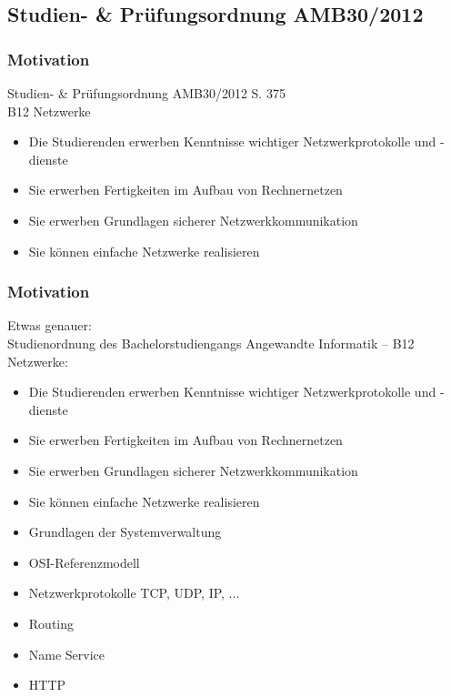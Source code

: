 \documentclass[xcolor=dvipsnames,aspectratio=169]{beamer}
\begin{document}
\subsection{Studien- \& Prüfungsordnung AMB30/2012}
\begin{frame}
	\frametitle{Motivation}
	Studien- \& Prüfungsordnung AMB30/2012 S. 375\\
	B12 Netzwerke
	\begin{itemize}
		\item Die Studierenden erwerben Kenntnisse wichtiger Netzwerkprotokolle und -dienste
		\item Sie erwerben Fertigkeiten im Aufbau von Rechnernetzen
		\item Sie erwerben Grundlagen sicherer Netzwerkkommunikation
		\item Sie können einfache Netzwerke realisieren
	\end{itemize}
\end{frame}
\begin{frame}
	\frametitle{Motivation}
	\vspace{-0.7cm}
	Etwas genauer:\\
	Studienordnung des Bachelorstudiengangs Angewandte Informatik -- B12 Netzwerke:
	\begin{itemize}
		\item Die Studierenden erwerben Kenntnisse wichtiger Netzwerkprotokolle und -dienste
		\item Sie erwerben Fertigkeiten im Aufbau von Rechnernetzen
		\item Sie erwerben Grundlagen sicherer Netzwerkkommunikation
		\item Sie können einfache Netzwerke realisieren
		\item Grundlagen der Systemverwaltung
		\item OSI-Referenzmodell
		\item Netzwerkprotokolle TCP, UDP, IP, ...
		\item Routing
		\item Name Service
		\item HTTP
	\end{itemize}
\end{frame}
\end{document}
